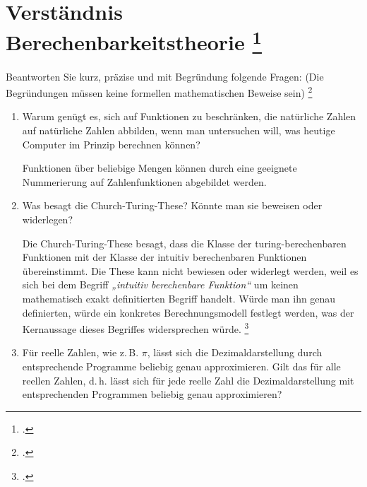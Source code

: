\documentclass{lehramt-informatik-aufgabe}
\begin{document}
\section{Verständnis Berechenbarkeitstheorie
\footcite{66115:2016:03}}

Beantworten Sie kurz, präzise und mit Begründung folgende Fragen: (Die
Begründungen müssen keine formellen mathematischen Beweise sein)
\footcite[Aufgabe 9: F2016T2A2 (Check-Up)]{theo:ab:4}

\begin{enumerate}


\item Warum genügt es, sich auf Funktionen zu beschränken, die
natürliche Zahlen auf natürliche Zahlen abbilden, wenn man untersuchen
will, was heutige Computer im Prinzip berechnen können?

\begin{liAntwort}
Funktionen über beliebige Mengen können durch eine geeignete
Nummerierung auf Zahlenfunktionen abgebildet werden.
\end{liAntwort}


\item Was besagt die Church-Turing-These? Könnte man sie beweisen oder
widerlegen?

\begin{liAntwort}
Die Church-Turing-These besagt, dass die Klasse der turing-berechen\-baren
Funktionen mit der Klasse der intuitiv berechenbaren Funktionen
übereinstimmt. Die These kann nicht bewiesen oder widerlegt werden, weil
es sich bei dem Begriff \emph{„intuitiv berechenbare Funktion“} um
keinen mathematisch exakt definitierten Begriff handelt. Würde man ihn
genau definierten, würde ein konkretes Berechnungsmodell festlegt
werden, was der Kernaussage dieses Begriffes widersprechen würde.
\footcite[Seite 308, These 6.1]{hoffmann}
\end{liAntwort}


\item Für reelle Zahlen, wie z.\,B. $\pi$, lässt sich die
Dezimaldarstellung durch entsprechende Programme beliebig genau
approximieren. Gilt das für alle reellen Zahlen, d.\,h. lässt sich für
jede reelle Zahl die Dezimaldarstellung mit entsprechenden Programmen
beliebig genau approximieren?


\end{enumerate}
\end{document}
